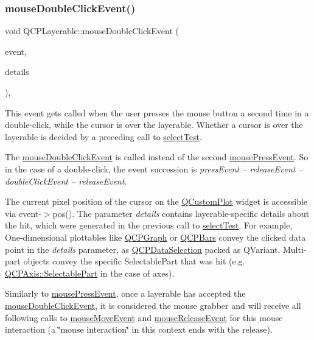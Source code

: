 \subsubsection{\texorpdfstring{mouse\+Double\+Click\+Event()}{mouseDoubleClickEvent()}}
{\footnotesize\ttfamily void Q\+C\+P\+Layerable\+::mouse\+Double\+Click\+Event (\begin{DoxyParamCaption}\item[{Q\+Mouse\+Event $\ast$}]{event,  }\item[{const Q\+Variant \&}]{details }\end{DoxyParamCaption})\hspace{0.3cm}{\ttfamily [protected]}, {\ttfamily [virtual]}}

This event gets called when the user presses the mouse button a second time in a double-\/click, while the cursor is over the layerable. Whether a cursor is over the layerable is decided by a preceding call to \mbox{\hyperlink{class_q_c_p_layerable_a04db8351fefd44cfdb77958e75c6288e}{select\+Test}}.

The \mbox{\hyperlink{class_q_c_p_layerable_a4171e2e823aca242dd0279f00ed2de81}{mouse\+Double\+Click\+Event}} is called instead of the second \mbox{\hyperlink{class_q_c_p_layerable_af6567604818db90f4fd52822f8bc8376}{mouse\+Press\+Event}}. So in the case of a double-\/click, the event succession is {\itshape press\+Event -- release\+Event -- double\+Click\+Event -- release\+Event}.

The current pixel position of the cursor on the \mbox{\hyperlink{class_q_custom_plot}{Q\+Custom\+Plot}} widget is accessible via {\ttfamily event-\/$>$pos()}. The parameter {\itshape details} contains layerable-\/specific details about the hit, which were generated in the previous call to \mbox{\hyperlink{class_q_c_p_layerable_a04db8351fefd44cfdb77958e75c6288e}{select\+Test}}. For example, One-\/dimensional plottables like \mbox{\hyperlink{class_q_c_p_graph}{Q\+C\+P\+Graph}} or \mbox{\hyperlink{class_q_c_p_bars}{Q\+C\+P\+Bars}} convey the clicked data point in the {\itshape details} parameter, as \mbox{\hyperlink{class_q_c_p_data_selection}{Q\+C\+P\+Data\+Selection}} packed as Q\+Variant. Multi-\/part objects convey the specific {\ttfamily Selectable\+Part} that was hit (e.\+g. \mbox{\hyperlink{class_q_c_p_axis_abee4c7a54c468b1385dfce2c898b115f}{Q\+C\+P\+Axis\+::\+Selectable\+Part}} in the case of axes).

Similarly to \mbox{\hyperlink{class_q_c_p_layerable_af6567604818db90f4fd52822f8bc8376}{mouse\+Press\+Event}}, once a layerable has accepted the \mbox{\hyperlink{class_q_c_p_layerable_a4171e2e823aca242dd0279f00ed2de81}{mouse\+Double\+Click\+Event}}, it is considered the mouse grabber and will receive all following calls to \mbox{\hyperlink{class_q_c_p_layerable_a9eee1ba47fd69be111059ca3881933e4}{mouse\+Move\+Event}} and \mbox{\hyperlink{class_q_c_p_layerable_aa0d79b005686f668622bbe66ac03ba2c}{mouse\+Release\+Event}} for this mouse interaction (a \char`\"{}mouse interaction\char`\"{} in this context ends with the release).

